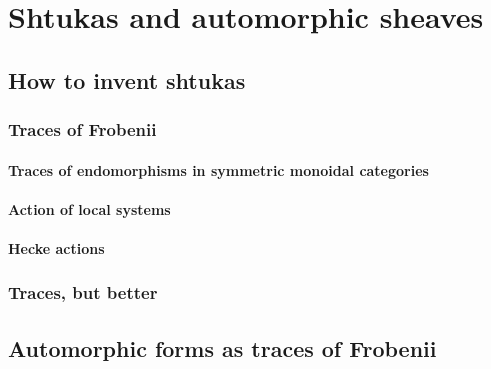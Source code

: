 \chapter{Shtukas and automorphic sheaves} \label{chapter: automorphic_forms}
    \begin{abstract}
        
    \end{abstract}
    
    \section{How to invent shtukas}
        \subsection{Traces of Frobenii}
            \subsubsection{Traces of endomorphisms in symmetric monoidal categories}
            
            \subsubsection{Action of local systems}
            
            \subsubsection{Hecke actions}
            
        \subsection{Traces, but better}
        
    \section{Automorphic forms as traces of Frobenii}